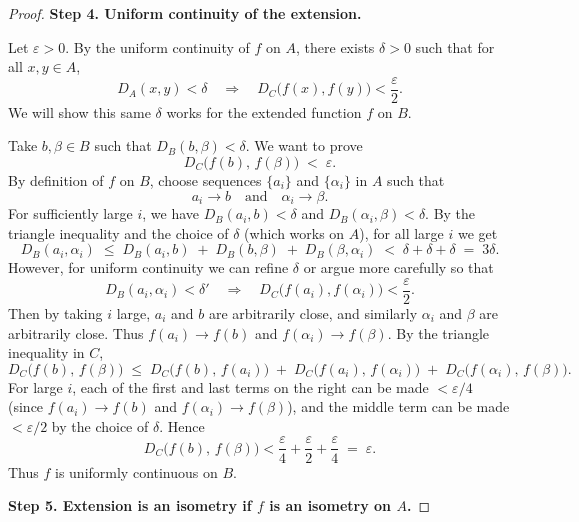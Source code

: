 \documentclass[12pt]{article}
\theoremstyle{definition} %
\theoremstyle{plain} %
\begin{document}
\begin{proof}
    \medskip
    
    \textbf{Step 4. Uniform continuity of the extension.}
    
    Let $\varepsilon > 0$. By the uniform continuity of $f$ on $A$, there exists $\delta > 0$ such that for all $x,y \in A$,
    \[
    D_A(x,y) < \delta \quad \Longrightarrow \quad D_C\bigl(f(x),f(y)\bigr) < \frac{\varepsilon}{2}.
    \]
    We will show this same $\delta$ works for the extended function $f$ on $B$. 
    
    Take $b,\beta \in B$ such that $D_B(b,\beta) < \delta$. We want to prove
    \[
    D_C\bigl(f(b),\,f(\beta)\bigr) \;<\; \varepsilon.
    \]
    By definition of $f$ on $B$, choose sequences $\{a_i\}$ and $\{\alpha_i\}$ in $A$ such that 
    \[
    a_i \to b \quad\text{and}\quad \alpha_i \to \beta.
    \]
    For sufficiently large $i$, we have $D_B(a_i, b) < \delta$ and $D_B(\alpha_i, \beta) < \delta$. By the triangle inequality and the choice of $\delta$ (which works on $A$), for all large $i$ we get
    \[
    D_B(a_i,\alpha_i) 
    \;\le\; D_B(a_i,b) \;+\; D_B(b,\beta) \;+\; D_B(\beta,\alpha_i) 
    \;<\; \delta + \delta + \delta \;=\; 3\delta.
    \]
    However, for uniform continuity we can refine $\delta$ or argue more carefully so that
    \[
    D_B(a_i,\alpha_i) < \delta' \quad\Longrightarrow\quad D_C\bigl(f(a_i),f(\alpha_i)\bigr) < \frac{\varepsilon}{2}.
    \]
    Then by taking $i$ large, $a_i$ and $b$ are arbitrarily close, and similarly $\alpha_i$ and $\beta$ are arbitrarily close. Thus $f(a_i) \to f(b)$ and $f(\alpha_i) \to f(\beta)$. By the triangle inequality in $C$,
    \[
    D_C\bigl(f(b),\,f(\beta)\bigr) 
    \;\le\; D_C\bigl(f(b),\,f(a_i)\bigr)
          \;+\; D_C\bigl(f(a_i),\,f(\alpha_i)\bigr)
          \;+\; D_C\bigl(f(\alpha_i),\,f(\beta)\bigr).
    \]
    For large $i$, each of the first and last terms on the right can be made $< \varepsilon/4$ (since $f(a_i)\to f(b)$ and $f(\alpha_i)\to f(\beta)$), and the middle term can be made $< \varepsilon/2$ by the choice of $\delta$. Hence
    \[
    D_C\bigl(f(b),\,f(\beta)\bigr) < \frac{\varepsilon}{4}
      + \frac{\varepsilon}{2} + \frac{\varepsilon}{4} 
      \;=\; \varepsilon.
    \]
    Thus $f$ is uniformly continuous on $B$.
    
    \medskip
    
    \textbf{Step 5. Extension is an isometry if $f$ is an isometry on $A$.}
    

\end{proof}
\end{document}
